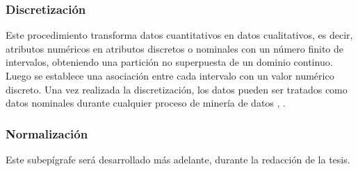 \subsubsection*{Discretización}
Este procedimiento transforma datos cuantitativos en datos cualitativos, es decir, atributos numéricos en atributos discretos o nominales con un número finito de intervalos, obteniendo una partición no superpuesta de un dominio continuo. Luego se establece una asociación entre cada intervalo con un valor numérico discreto. Una vez realizada la discretización, los datos pueden ser tratados como datos nominales durante cualquier proceso de minería de datos \citep{garcia2015data}, \citep{garcia2012survey}.


\subsubsection*{Normalización}
Este subepígrafe será desarrollado más adelante, durante la redacción de la tesis.

